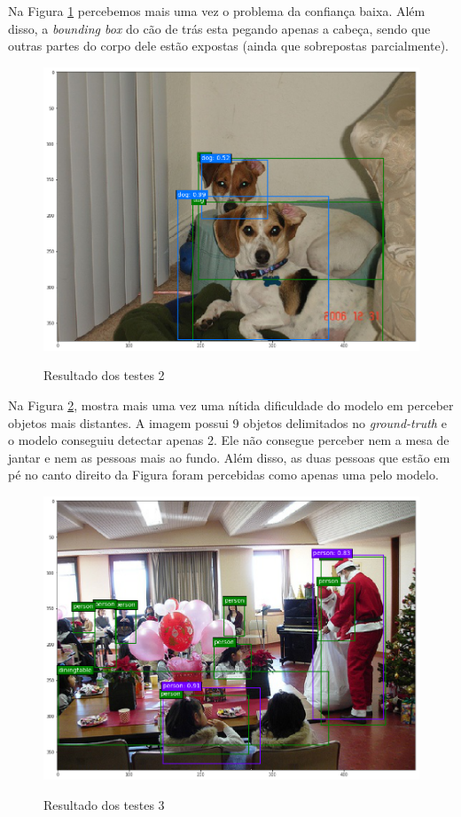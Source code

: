 Na Figura \ref{fig:teste_2} percebemos mais uma vez o problema da confiança baixa. Além disso, a \textit{bounding box} do cão de trás esta pegando apenas a cabeça, sendo que outras partes do corpo dele estão expostas (ainda que sobrepostas parcialmente).

\begin{figure}[t]
	\setlength{\abovecaptionskip}{0pt}
	\setlength{\belowcaptionskip}{0pt}
	\caption[Resultado dos testes 2]{Resultado dos testes 2}
	\centering
	\includegraphics[width=.6\textwidth]{imagem/test_image_3.png}
	\captionsetup{justification=centering}
	\label{fig:teste_2}
\end{figure}

Na Figura \ref{fig:teste_3}, mostra mais uma vez uma nítida dificuldade do modelo em perceber objetos mais distantes. A imagem possui 9 objetos delimitados no \textit{ground-truth} e o modelo conseguiu detectar apenas 2. Ele não consegue perceber nem a mesa de jantar e nem as pessoas mais ao fundo. Além disso, as duas pessoas que estão em pé no canto direito da Figura foram percebidas como apenas uma pelo modelo.

\begin{figure}[t]
	\setlength{\abovecaptionskip}{0pt}
	\setlength{\belowcaptionskip}{0pt}
	\caption[Resultado dos testes 3]{Resultado dos testes 3}
	\centering
	\includegraphics[width=.6\textwidth]{imagem/test_image_1.png}
	\captionsetup{justification=centering}
	\label{fig:teste_3}
\end{figure}

